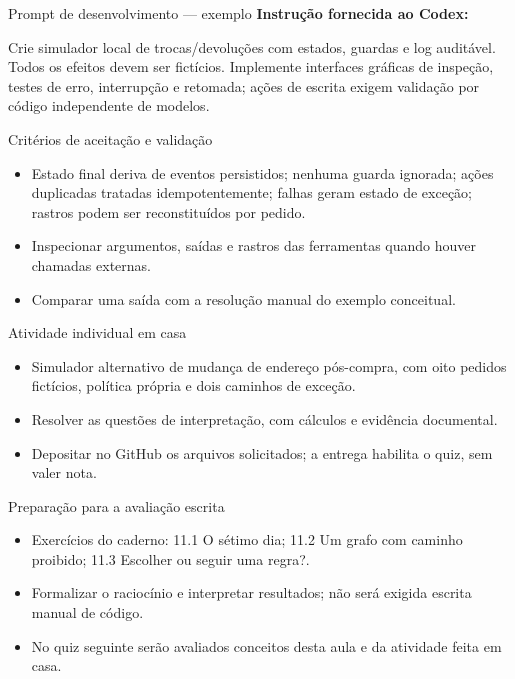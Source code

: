\documentclass[10pt,aspectratio=169]{beamer}
\begin{document}
\begin{frame}[t]{Prompt de desenvolvimento — exemplo}
\small
\small\textbf{Instrução fornecida ao Codex:}\par\vspace{5mm}Crie simulador local de trocas/devoluções com estados, guardas e log auditável. Todos os efeitos devem ser fictícios. Implemente interfaces gráficas de inspeção, testes de erro, interrupção e retomada; ações de escrita exigem validação por código independente de modelos.
\end{frame}

\begin{frame}[t]{Critérios de aceitação e validação}
\small
\begin{itemize}
\item Estado final deriva de eventos persistidos; nenhuma guarda ignorada; ações duplicadas tratadas idempotentemente; falhas geram estado de exceção; rastros podem ser reconstituídos por pedido.
\item Inspecionar argumentos, saídas e rastros das ferramentas quando houver chamadas externas.
\item Comparar uma saída com a resolução manual do exemplo conceitual.
\end{itemize}
\end{frame}

\begin{frame}[t]{Atividade individual em casa}
\small
\begin{itemize}
\item Simulador alternativo de mudança de endereço pós-compra, com oito pedidos fictícios, política própria e dois caminhos de exceção.
\item Resolver as questões de interpretação, com cálculos e evidência documental.
\item Depositar no GitHub os arquivos solicitados; a entrega habilita o quiz, sem valer nota.
\end{itemize}
\end{frame}

\begin{frame}[t]{Preparação para a avaliação escrita}
\small
\begin{itemize}
\item Exercícios do caderno: 11.1 O sétimo dia; 11.2 Um grafo com caminho proibido; 11.3 Escolher ou seguir uma regra?.
\item Formalizar o raciocínio e interpretar resultados; não será exigida escrita manual de código.
\item No quiz seguinte serão avaliados conceitos desta aula e da atividade feita em casa.
\end{itemize}
\end{frame}
\end{document}
